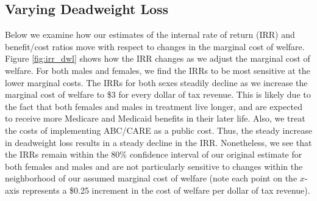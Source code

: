 \subsection{Varying Deadweight Loss}

\noindent Below we examine how our estimates of the internal rate of return (IRR) and benefit/cost
ratios move with respect to changes in the marginal cost of welfare. \\

\noindent Figure \ref{fig:irr_dwl} shows how the IRR changes as we adjust
the marginal cost of welfare. For both males and females, we find the IRRs
to be most sensitive at the lower marginal costs. The IRRs for both sexes
steadily decline as we increase the marginal cost of welfare to \$3 for every dollar
of tax revenue. This is likely due
to the fact that both females and males in treatment live longer, and are expected to 
receive more Medicare and Medicaid benefits in their later life. 
Also, we treat the costs of implementing ABC/CARE as a public cost. 
Thus, the steady increase in deadweight loss results in a 
steady decline in the IRR. Nonetheless, we see that the IRRs 
remain within the 80\% confidence interval of our original estimate 
for both females and males and are not particularly sensitive to changes within the 
neighborhood of our assumed marginal cost of welfare (note each point on the $x$-axis
represents a \$0.25 increment in the cost of welfare per dollar of tax revenue). 



